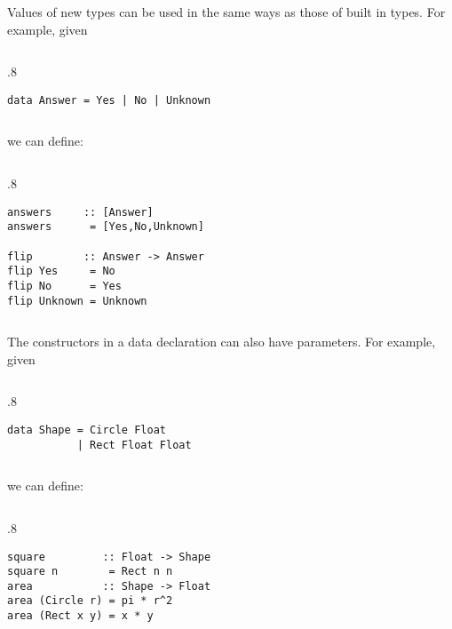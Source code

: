 \documentclass{beamer}
\newenvironment{codeblock}[1][.8]{%
\begin{columns}
\begin{column}{#1\linewidth}
\begin{exampleblock}{}}{%
\end{exampleblock}
\end{column}
\end{columns}}
\def\slideskip{\vskip 0.1in}
\begin{document}
\begin{frame}[fragile]
\large

Values of new types can be used in the same ways 
as those of built in types.  For example, given
\slideskip

\begin{codeblock}
\vspace{-2ex}
\begin{verbatim}
data Answer = Yes | No | Unknown 
\end{verbatim}
\vspace{-2ex}
\end{codeblock}

\slideskip
we can define:
\slideskip

\begin{codeblock}
\vspace{-2ex}
\begin{verbatim}
answers     :: [Answer] 
answers      = [Yes,No,Unknown] 

flip        :: Answer -> Answer 
flip Yes     = No 
flip No      = Yes 
flip Unknown = Unknown 
\end{verbatim}
\vspace{-2ex}
\end{codeblock}

\end{frame}

\begin{frame}[fragile]
\large

The constructors in a data declaration can also have 
parameters.  For example, given 
\slideskip

\begin{codeblock}
\vspace{-2ex}
\begin{verbatim}
data Shape = Circle Float 
           | Rect Float Float 
\end{verbatim}
\vspace{-2ex}
\end{codeblock}

\slideskip
we can define:
\slideskip

\begin{codeblock}
\vspace{-2ex}
\begin{verbatim}
square         :: Float -> Shape 
square n        = Rect n n 
area           :: Shape -> Float 
area (Circle r) = pi * r^2 
area (Rect x y) = x * y 
\end{verbatim}
\vspace{-2ex}
\end{codeblock}

\end{frame}
\end{document}
